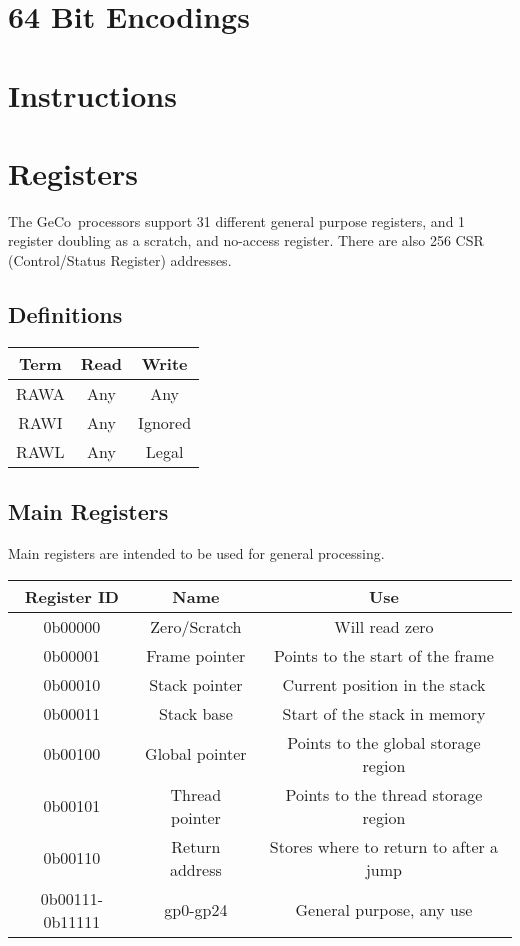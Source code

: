 \documentclass{article}
\def\sname{GeCo}
\begin{document}
\section{64 Bit Encodings}

\section{Instructions}

\section{Registers}
The \sname\ processors support 31 different general purpose registers, and 1 register doubling as a scratch, and no-access register. There are also 256 CSR (Control/Status Register) addresses.

\subsection{Definitions}
\begin{center}
\begin{tabular}{ |c|c|c| }
    \hline
    Term & Read & Write \\
    \hline
    RAWA & Any & Any \\
    \hline
    RAWI & Any & Ignored \\
    \hline
    RAWL & Any & Legal \\
    \hline
\end{tabular}
\end{center}

\subsection{Main Registers}
Main registers are intended to be used for general processing.
\begin{center}
\begin{tabular}{ |c|c|c| }
    \hline
    Register ID & Name & Use \\
    \hline
    0b00000 & Zero/Scratch & Will read zero\footnotemark[1]\\
    \hline
    0b00001 & Frame pointer & Points to the start of the frame \\
    \hline
    0b00010 & Stack pointer & Current position in the stack \\
    \hline
    0b00011 & Stack base & Start of the stack in memory \\
    \hline
    0b00100 & Global pointer & Points to the global storage region \\
    \hline
    0b00101 & Thread pointer & Points to the thread storage region \\
    \hline
    0b00110 & Return address & Stores where to return to after a jump \\
    \hline
    0b00111-0b11111 & gp0-gp24 & General purpose, any use \\
    \hline
\end{tabular}
\end{center}
\end{document}
